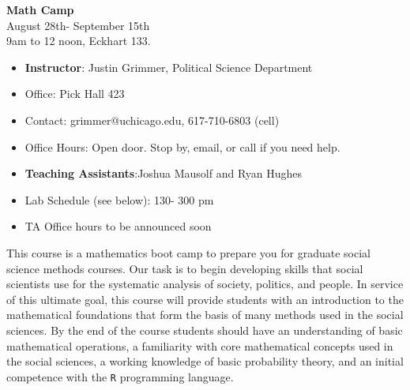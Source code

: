\documentclass[11pt,letterpaper]{article}
\numberwithin{equation}{section}
\begin{document}
\begin{center}
\textbf{Math Camp} \\
August 28th- September 15th\\
9am to 12 noon, Eckhart 133.
\end{center}

\begin{itemize}
\item[]\textbf{Instructor}: Justin Grimmer, Political Science Department
\item[]Office: Pick Hall 423
\item[]Contact: grimmer@uchicago.edu, 617-710-6803 (cell)
\item[]Office Hours:  Open door. Stop by, email, or call if you need help.
\end{itemize}


\begin{itemize}
\item[] \textbf{Teaching Assistants}:Joshua Mausolf and Ryan Hughes
\item[] Lab Schedule (see below): 130- 300 pm
\item[] TA Office hours to be announced soon
\end{itemize}



\noindent This course is a mathematics boot camp to prepare you for graduate social science methods courses.  Our task is to begin developing skills that social scientists use for the systematic analysis of society, politics, and people.  In service of this ultimate goal, this course will provide students with an introduction to the mathematical foundations that form the basis of many methods used in the social sciences. By the end of the course students should have an understanding of basic mathematical operations, a familiarity with core mathematical concepts used in the social sciences, a working knowledge of basic probability theory, and an initial competence with the {\tt R} programming language.
\end{document}
